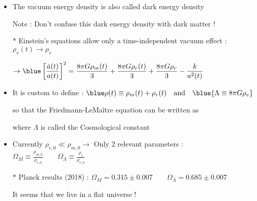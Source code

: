 \Tr
\begin{itemize}
\item The vacuum energy density is also called {\blue dark energy density}
\item[] Note : Don't confuse this dark energy density with dark matter !
\item[$\ast$] Einstein's equations allow only a {\red time-independent vacuum effect} :
        $\rho_{v}(t) \rightarrow \rho_{v}$
\item[] $\displaystyle \rightarrow {\blue \left[\frac{\dot{a}(t)}{a(t)}\right]^{2}=
         \frac{8\pi G\rho_{m}(t)}{3}+\frac{8\pi G\rho_{r}(t)}{3}+\frac{8\pi G\rho_{v}}{3}
         -\frac{k}{a^{2}(t)}}$
\item It is custom to define : ${\blue \rho(t) \equiv \rho_{m}(t)+\rho_{r}(t)} \text{~~~and~~~} \blue{\Lambda \equiv 8\pi G\rho_{v}}$
\item[] so that the Friedmann-LeMa\^{i}tre equation can be written as
\item[] \begin{center}
        {\red {}}
        \end{center}
\item[] where {\blue $\Lambda$} is called the {\blue Cosmological constant}
\item Currently $\rho_{r,0} \ll \rho_{m,0} \rightarrow$ Only $2$ relevant parameters :
      {\blue $\displaystyle \Omega_{M} \equiv \frac{\rho_{m,0}}{\rho_{c,0}} \qquad
      \Omega_{\Lambda} \equiv \frac{\rho_{v}}{\rho_{c,0}}$}
\item[$\ast$] Planck results (2018) : {\red $\Omega_{M}=0.315 \pm 0.007 \qquad \Omega_{\Lambda}=0.685 \pm 0.007$}
\item[] {\blue It seems that we live in a flat universe !}
\end{itemize}

